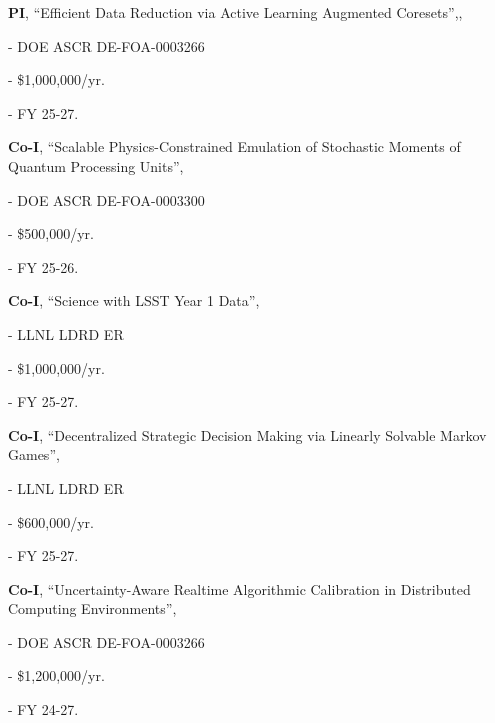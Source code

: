 \begin{innerlist}

  \item[] \textbf{PI},
  ``Efficient Data Reduction via Active Learning Augmented Coresets'',,
  \begin{innerlist}
    \item[-] DOE ASCR DE-FOA-0003266
    \item[-] \$1,000,000/yr.
    \item[-] FY 25-27.
  \end{innerlist}

  \item[] \textbf{Co-I},
  ``Scalable Physics-Constrained Emulation of Stochastic Moments of Quantum Processing Units'',
  \begin{innerlist}
    \item[-] DOE ASCR DE-FOA-0003300
    \item[-] \$500,000/yr.
    \item[-] FY 25-26.
  \end{innerlist}

  \item[] \textbf{Co-I},
  ``Science with LSST Year 1 Data'',
  \begin{innerlist}
    \item[-] LLNL LDRD ER
    \item[-] \$1,000,000/yr.
    \item[-] FY 25-27.
  \end{innerlist}

  \item[] \textbf{Co-I},
  ``Decentralized Strategic Decision Making via Linearly Solvable Markov Games'',
  \begin{innerlist}
    \item[-] LLNL LDRD ER
    \item[-] \$600,000/yr.
    \item[-] FY 25-27.
  \end{innerlist}

  \item[] \textbf{Co-I},
  ``Uncertainty-Aware Realtime Algorithmic Calibration in Distributed Computing Environments'',
  \begin{innerlist}
    \item[-] DOE ASCR DE-FOA-0003266
    \item[-] \$1,200,000/yr.
    \item[-] FY 24-27.
  \end{innerlist}


\end{innerlist}
